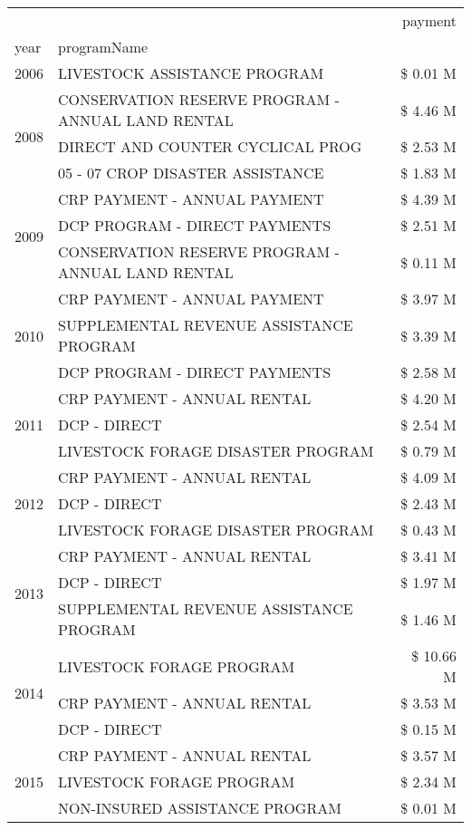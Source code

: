 \begin{tabular}{llr}
\toprule
 &  & payment \\
year & programName &  \\
\midrule
2006 & LIVESTOCK ASSISTANCE PROGRAM & \$ 0.01 M \\
\cline{1-3}
\multirow[t]{3}{*}{2008} & CONSERVATION RESERVE PROGRAM - ANNUAL LAND RENTAL & \$ 4.46 M \\
 & DIRECT AND COUNTER CYCLICAL PROG & \$ 2.53 M \\
 & 05 - 07 CROP DISASTER ASSISTANCE & \$ 1.83 M \\
\cline{1-3}
\multirow[t]{3}{*}{2009} & CRP PAYMENT - ANNUAL PAYMENT & \$ 4.39 M \\
 & DCP PROGRAM - DIRECT PAYMENTS & \$ 2.51 M \\
 & CONSERVATION RESERVE PROGRAM - ANNUAL LAND RENTAL & \$ 0.11 M \\
\cline{1-3}
\multirow[t]{3}{*}{2010} & CRP PAYMENT - ANNUAL PAYMENT & \$ 3.97 M \\
 & SUPPLEMENTAL REVENUE ASSISTANCE PROGRAM & \$ 3.39 M \\
 & DCP PROGRAM - DIRECT PAYMENTS & \$ 2.58 M \\
\cline{1-3}
\multirow[t]{3}{*}{2011} & CRP PAYMENT - ANNUAL RENTAL & \$ 4.20 M \\
 & DCP - DIRECT & \$ 2.54 M \\
 & LIVESTOCK FORAGE DISASTER PROGRAM & \$ 0.79 M \\
\cline{1-3}
\multirow[t]{3}{*}{2012} & CRP PAYMENT - ANNUAL RENTAL & \$ 4.09 M \\
 & DCP - DIRECT & \$ 2.43 M \\
 & LIVESTOCK FORAGE DISASTER PROGRAM & \$ 0.43 M \\
\cline{1-3}
\multirow[t]{3}{*}{2013} & CRP PAYMENT - ANNUAL RENTAL & \$ 3.41 M \\
 & DCP - DIRECT & \$ 1.97 M \\
 & SUPPLEMENTAL REVENUE ASSISTANCE PROGRAM & \$ 1.46 M \\
\cline{1-3}
\multirow[t]{3}{*}{2014} & LIVESTOCK FORAGE PROGRAM & \$ 10.66 M \\
 & CRP PAYMENT - ANNUAL RENTAL & \$ 3.53 M \\
 & DCP - DIRECT & \$ 0.15 M \\
\cline{1-3}
\multirow[t]{3}{*}{2015} & CRP PAYMENT - ANNUAL RENTAL & \$ 3.57 M \\
 & LIVESTOCK FORAGE PROGRAM & \$ 2.34 M \\
 & NON-INSURED ASSISTANCE PROGRAM & \$ 0.01 M \\

\end{tabular}
